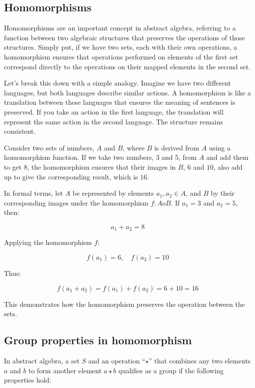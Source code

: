 \documentclass[
  letterpaper,
  DIV=11,
  numbers=noendperiod,
  oneside]{scrartcl}
\begin{document}
\subsection{Homomorphisms}\label{homomorphisms}

Homomorphisms are an important concept in abstract algebra, referring to
a function between two algebraic structures that preserves the
operations of those structures. Simply put, if we have two sets, each
with their own operations, a homomorphism ensures that operations
performed on elements of the first set correspond directly to the
operations on their mapped elements in the second set.

Let's break this down with a simple analogy. Imagine we have two
different languages, but both languages describe similar actions. A
homomorphism is like a translation between these languages that ensures
the meaning of sentences is preserved. If you take an action in the
first language, the translation will represent the same action in the
second language. The structure remains consistent.

Consider two sets of numbers, \(A\) and \(B\), where \(B\) is derived
from \(A\) using a homomorphism function. If we take two numbers, \(3\)
and \(5\), from \(A\) and add them to get \(8\), the homomorphism
ensures that their images in \(B\), \(6\) and \(10\), also add up to
give the corresponding result, which is \(16\).

In formal terms, let \(A\) be represented by elements
\(a_1, a_2 \in A\), and \(B\) by their corresponding images under the
homomorphism \(f: A    o B\). If \(a_1 = 3\) and \(a_2 = 5\), then:

\[
a_1 + a_2 = 8
\]

Applying the homomorphism \(f\):

\[
f(a_1) = 6, \quad f(a_2) = 10
\]

Thus:

\[
f(a_1 + a_2) = f(a_1) + f(a_2) = 6 + 10 = 16
\]

This demonstrates how the homomorphism preserves the operation between
the sets.

\subsection{Group properties in
homomorphism}\label{group-properties-in-homomorphism}

In abstract algebra, a set \(S\) and an operation ``\(\star\)'' that
combines any two elements \(a\) and \(b\) to form another element
\(a \star b\) qualifies as a group if the following properties hold:
\end{document}
